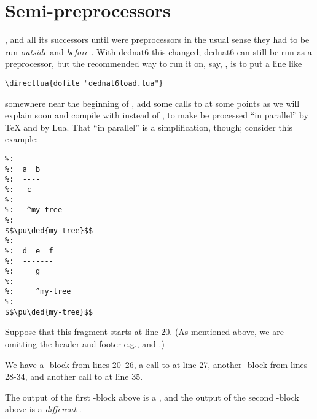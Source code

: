 \documentclass{ltugboat}
\begin{document}
%
\section{Semi-preprocessors}

,  and all its successors until  were
preprocessors in the usual sense \Dash they had to be run {\sl outside}
 and {\sl before} . With dednat6 this changed;
dednat6 can still be run as a preprocessor, but the recommended way to
run it on, say, , is to put a line like
%
\begin{verbatim}
\directlua{dofile "dednat6load.lua"}
\end{verbatim}
%
somewhere near the beginning of , add some calls to \co{\\pu} at
some points \Dash as we will explain soon \Dash and compile  with
 instead of , to make  be processed ``in
parallel'' by \TeX{} and by Lua. That ``in parallel'' is a
simplification, though; consider this example:

\begin{verbatim}
%:
%:  a  b
%:  ----
%:   c
%:
%:   ^my-tree
%:
$$\pu\ded{my-tree}$$
%:
%:  d  e  f
%:  -------
%:     g
%:
%:     ^my-tree
%:
$$\pu\ded{my-tree}$$
\end{verbatim}

Suppose that this fragment starts at line 20. (As mentioned above, we
are omitting the
header and footer \Dash e.g.,  and
.)

We have a \co{\%:}-block from lines 20--26, a call to \co{\\pu} at
line 27, another \co{\%:}-block from lines 28-34, and another call to
\co{\\pu} at line 35.

The output of the first \co{\%:}-block above is a
, and the output of the second \co{\%:}-block
above is a {\sl different} . 
\end{document}
